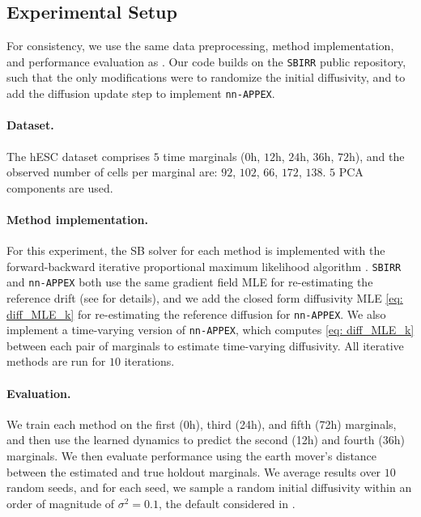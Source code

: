 \documentclass[twoside]{article}
\newcommand{\nappex}{\texttt{nn-APPEX}}
\newcommand{\sbirr}{\texttt{SBIRR}}
\begin{document}
\subsection{Experimental Setup}

For consistency, we use the same data preprocessing, method implementation, and performance evaluation as \citet{shen2025multi}. Our code builds on the \sbirr{} public repository, such that the only modifications were to randomize the initial diffusivity, and to add the diffusion update step to implement \nappex.

\paragraph{Dataset.} The hESC dataset \citep{chu2016single} comprises $5$ time marginals ($0$h, $12$h, $24$h, $36$h, $72$h), and the observed number of cells per marginal are: $92$, $102$, $66$, $172$, $138$. $5$ PCA components are used.

\paragraph{Method implementation.} For this experiment, the SB solver for each method is implemented with the forward-backward iterative proportional maximum likelihood algorithm \citep{vargas2021solving}. \sbirr{} and \nappex{} both use the same gradient field MLE for re-estimating the reference drift (see 
\citet[Section D.6.2]{shen2025multi} for details), and we add the closed form diffusivity MLE \eqref{eq: diff_MLE_k} for re-estimating the reference diffusion for \nappex. We also implement a time-varying version of \nappex, which computes \eqref{eq: diff_MLE_k} between each pair of marginals to estimate time-varying diffusivity. All iterative methods are run for $10$ iterations. 

\paragraph{Evaluation.} We train each method on the first (0h), third (24h), and fifth (72h) marginals, and then use the learned dynamics to predict the second (12h) and fourth (36h) marginals. We then evaluate performance using the earth mover's distance between the estimated and true holdout marginals. We average results over $10$ random seeds, and for each seed, we sample a random initial diffusivity within an order of magnitude of $\sigma^2 = 0.1$, the default considered in \citet{shen2025multi}.
\end{document}
